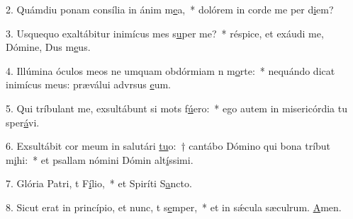 2. Quámdiu ponam consília in ánim m\uline{e}a,~* dolórem in corde me per d\uline{i}em?\par 
3. Usquequo exaltábitur inimícus mes s\uline{u}per me?~* réspice, et exáudi me, Dómine, Dus m\uline{e}us.\par 
4. Illúmina óculos meos ne umquam obdórmiam n m\uline{o}rte:~* nequándo dicat inimícus meus: præválui advrsus \uline{e}um.\par 
5. Qui tríbulant me, exsultábunt si mots f\uline{ú}ero:~* ego autem in misericórdia tu sper\uline{á}vi.\par 
6. Exsultábit cor meum in salutári \uline{tu}o:~† cantábo Dómino qui bona tríbut m\uline{i}hi:~* et psallam nómini Dómin alt\uline{í}ssimi.\par 
7. Glória Patri, t F\uline{í}lio,~* et Spiríti S\uline{a}ncto.\par 
8. Sicut erat in princípio, et nunc, t s\uline{e}mper,~* et in sǽcula sæculrum. \uline{A}men.\par 

